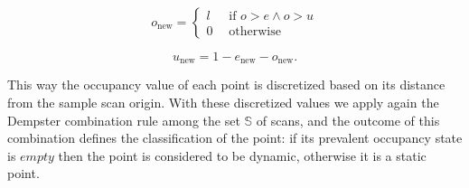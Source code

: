 \begin{equation}
 o_{\text{new}} = \begin{cases}
      l\ \ \ &\mbox{if }o > e \wedge o > u \\
      0 &\mbox{otherwise}
     \end{cases}
\end{equation}

\begin{equation}
 u_{\text{new}} = 1 - e_{\text{new}} - o_{\text{new}}.
\end{equation}

 This way the occupancy value of each point is discretized based on its distance from the sample scan origin. With these discretized values we apply again the Dempster combination rule among the set $\mathbb{S}$ of scans, and the outcome of this combination defines the classification of the point: if its prevalent occupancy state is $empty$ then the point is considered to be dynamic, otherwise it is a static point. 
  
 
